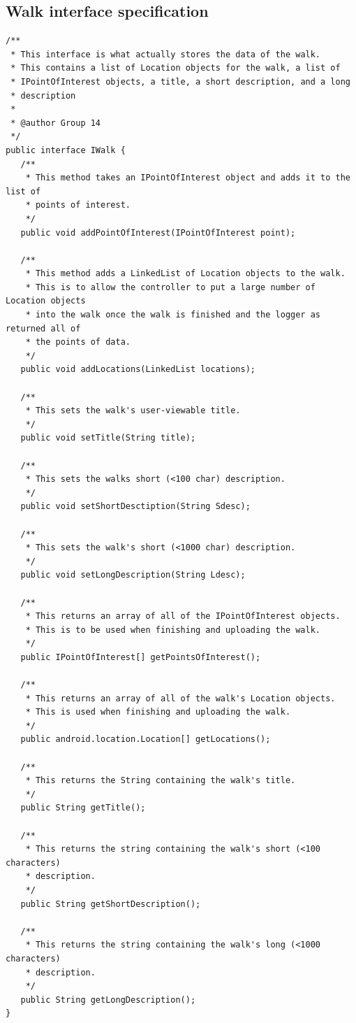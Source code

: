 \documentclass{project}
\begin{document}
\subsection{Walk interface specification}
\begin{verbatim}/**
 * This interface is what actually stores the data of the walk. 
 * This contains a list of Location objects for the walk, a list of
 * IPointOfInterest objects, a title, a short description, and a long
 * description
 *
 * @author Group 14
 */
public interface IWalk {
   /**
    * This method takes an IPointOfInterest object and adds it to the list of
    * points of interest.
    */
   public void addPointOfInterest(IPointOfInterest point);
   
   /**
    * This method adds a LinkedList of Location objects to the walk. 
    * This is to allow the controller to put a large number of Location objects
    * into the walk once the walk is finished and the logger as returned all of
    * the points of data.
    */
   public void addLocations(LinkedList locations);
   
   /**
    * This sets the walk's user-viewable title.
    */
   public void setTitle(String title);
   
   /**
    * This sets the walks short (<100 char) description.
    */
   public void setShortDesctiption(String Sdesc);

   /**
    * This sets the walk's short (<1000 char) description. 
    */
   public void setLongDescription(String Ldesc);
   
   /**
    * This returns an array of all of the IPointOfInterest objects. 
    * This is to be used when finishing and uploading the walk.
    */
   public IPointOfInterest[] getPointsOfInterest();
   
   /**
    * This returns an array of all of the walk's Location objects. 
    * This is used when finishing and uploading the walk.
    */
   public android.location.Location[] getLocations();

   /**
    * This returns the String containing the walk's title.
    */
   public String getTitle();
   
   /**
    * This returns the string containing the walk's short (<100 characters)
    * description.
    */
   public String getShortDescription();
   
   /**
    * This returns the string containing the walk's long (<1000 characters)
    * description.
    */
   public String getLongDescription();
}\end{verbatim}
\end{document}
